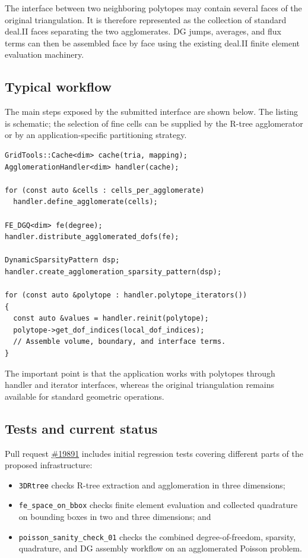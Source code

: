 \documentclass[a4paper,12pt]{article}
\begin{document}
The interface between two neighboring polytopes may contain several faces of
the original triangulation. It is therefore represented as the collection of
standard deal.II faces separating the two agglomerates. DG jumps, averages,
and flux terms can then be assembled face by face using the existing deal.II
finite element evaluation machinery.

\subsection{{Typical workflow}}

The main steps exposed by the submitted interface are shown below. The
listing is schematic; the selection of fine cells can be supplied by the
R-tree agglomerator or by an application-specific partitioning strategy.

\begin{lstlisting}[caption=Schematic workflow for an agglomerated DG method]
GridTools::Cache<dim> cache(tria, mapping);
AgglomerationHandler<dim> handler(cache);

for (const auto &cells : cells_per_agglomerate)
  handler.define_agglomerate(cells);

FE_DGQ<dim> fe(degree);
handler.distribute_agglomerated_dofs(fe);

DynamicSparsityPattern dsp;
handler.create_agglomeration_sparsity_pattern(dsp);

for (const auto &polytope : handler.polytope_iterators())
{
  const auto &values = handler.reinit(polytope);
  polytope->get_dof_indices(local_dof_indices);
  // Assemble volume, boundary, and interface terms.
}
\end{lstlisting}

The important point is that the application works with polytopes through
handler and iterator interfaces, whereas the original triangulation remains
available for standard geometric operations.

\subsection{{Tests and current status}}

Pull request \href{https://github.com/dealii/dealii/pull/19891}{\#19891} includes initial regression tests covering different
parts of the proposed infrastructure:
\begin{itemize}
    \item \texttt{3DRtree} checks R-tree extraction and agglomeration in
          three dimensions;
    \item \texttt{fe\_space\_on\_bbox} checks finite element evaluation and
          collected quadrature on bounding boxes in two and three dimensions;
          and
    \item \texttt{poisson\_sanity\_check\_01} checks the combined degree-of-freedom, sparsity, quadrature, and DG assembly workflow on an
          agglomerated Poisson problem.
\end{itemize}
\end{document}
